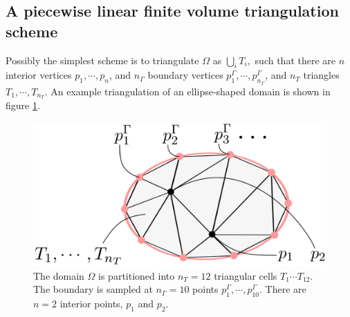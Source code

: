 \subsection{A piecewise linear finite volume triangulation scheme}
Possibly the simplest scheme is to triangulate $\Omega$ as
    $\bigcup_i T_i,$
such that there are $n$ interior vertices $p_1,\cdots,p_n$, and $n_\Gamma$ boundary vertices $p^\Gamma_1,\cdots,p^\Gamma_{n_\Gamma}$, and $n_T$ triangles
$T_1,\cdots,T_{n_T}$. An example triangulation of an ellipse-shaped domain is shown in figure \ref{triangulation}.
\begin{figure}[H]
    \begin{center}
        \includegraphics[width=0.53\linewidth]{figures/triangulation/triangulation.png}
    \end{center}
    \caption{\scriptsize
        The domain $\Omega$ is partitioned into $n_T = 12$ triangular cells $T_1\cdots T_{12}$. The boundary is sampled at $n_\Gamma = 10$ points
        $p^\Gamma_1,\cdots,p^\Gamma_{10}$.
        There are $n = 2$ interior points, $p_1$ and $p_2$.
    }
    \label{triangulation}
\end{figure}

